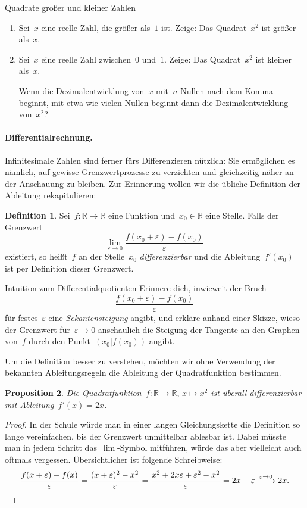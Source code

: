 \documentclass[twoside]{../zirkelblatt}
\newcommand{\RR}{\mathbb{R}}
\newcommand{\xra}[1]{\xrightarrow{#1}}
\theoremstyle{definition}
\newtheorem{defn}{Definition}[section]
\theoremstyle{plain}
\newtheorem{prop}[defn]{Proposition}
\theoremstyle{remark}
\begin{document}
\begin{aufgabeShaded}{Quadrate großer und kleiner Zahlen}
\begin{enumerate}
\item Sei~$x$ eine reelle Zahl, die größer als~$1$ ist. Zeige: Das
Quadrat~$x^2$ ist größer als~$x$.
\item Sei~$x$ eine reelle Zahl zwischen~$0$ und~$1$. Zeige: Das Quadrat~$x^2$
ist kleiner als~$x$.

Wenn die Dezimalentwicklung von~$x$ mit~$n$ Nullen nach dem Komma beginnt, mit
etwa wie vielen Nullen beginnt dann die Dezimalentwicklung von~$x^2$?
\end{enumerate}
\end{aufgabeShaded}

\paragraph{Differentialrechnung.}
Infinitesimale Zahlen sind ferner fürs Differenzieren nützlich: Sie ermöglichen
es nämlich, auf gewisse Grenzwertprozesse zu verzichten und gleichzeitig näher
an der Anschauung zu bleiben. Zur Erinnerung wollen wir die übliche Definition
der Ableitung rekapitulieren:

\begin{defn}Sei~$f : \RR \to \RR$ eine Funktion und~$x_0 \in \RR$ eine Stelle.
Falls der Grenzwert
\[ \lim_{\varepsilon \to 0} \frac{f(x_0 + \varepsilon) - f(x_0)}{\varepsilon} \]
existiert, so heißt~$f$ an der Stelle~$x_0$ \emph{differenzierbar} und die
Ableitung~$f'(x_0)$ ist per Definition dieser Grenzwert.
\end{defn}

\begin{aufgabeShaded}{Intuition zum Differentialquotienten}
Erinnere dich, inwieweit der Bruch
\[ \frac{f(x_0 + \varepsilon) - f(x_0)}{\varepsilon} \]
für festes~$\varepsilon$ eine \emph{Sekantensteigung} angibt, und erkläre anhand einer Skizze, wieso der
Grenzwert für~$\varepsilon \to 0$ anschaulich die Steigung der Tangente an den
Graphen von~$f$ durch den Punkt~$(x_0|f(x_0))$ angibt.
\end{aufgabeShaded}

Um die Definition besser zu verstehen, möchten wir ohne Verwendung der bekannten
Ableitungsregeln die Ableitung der Quadratfunktion bestimmen.

\begin{prop}Die Quadratfunktion~$f : \RR \to \RR,\,x \mapsto x^2$ ist überall
differenzierbar mit Ableitung~$f'(x) = 2x$.\end{prop}
\begin{proof}In der Schule würde man in einer langen Gleichungskette die
Definition so lange vereinfachen, bis der Grenzwert unmittelbar ablesbar ist.
Dabei müsste man in jedem Schritt das~$\lim$-Symbol mitführen, würde das aber
vielleicht auch oftmals vergessen. Übersichtlicher ist folgende Schreibweise:
\[ \frac{f(x + \varepsilon) - f(x)}{\varepsilon} =
  \frac{(x + \varepsilon)^2 - x^2}{\varepsilon} =
  \frac{x^2 + 2x\varepsilon + \varepsilon^2 - x^2}{\varepsilon} =
  2x + \varepsilon \xra{\varepsilon \to 0} 2x. \qedhere \]
\end{proof}
\end{document}
